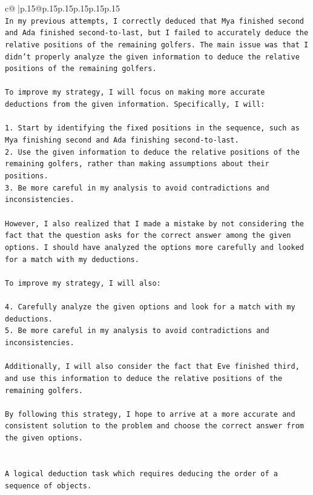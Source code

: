 \documentclass{article}
\begin{document}
{\begin{supertabular}{c@{$\;$}|p{.15\linewidth}@{}p{.15\linewidth}p{.15\linewidth}p{.15\linewidth}p{.15\linewidth}p{.15\linewidth}}
{{{\\ 
\texttt{In my previous attempts, I correctly deduced that Mya finished second and Ada finished second{-}to{-}last, but I failed to accurately deduce the relative positions of the remaining golfers. The main issue was that I didn't properly analyze the given information to deduce the relative positions of the remaining golfers.} \\
\\ 
\texttt{To improve my strategy, I will focus on making more accurate deductions from the given information. Specifically, I will:} \\
\\ 
\texttt{1. Start by identifying the fixed positions in the sequence, such as Mya finishing second and Ada finishing second{-}to{-}last.} \\
\texttt{2. Use the given information to deduce the relative positions of the remaining golfers, rather than making assumptions about their positions.} \\
\texttt{3. Be more careful in my analysis to avoid contradictions and inconsistencies.} \\
\\ 
\texttt{However, I also realized that I made a mistake by not considering the fact that the question asks for the correct answer among the given options. I should have analyzed the options more carefully and looked for a match with my deductions.} \\
\\ 
\texttt{To improve my strategy, I will also:} \\
\\ 
\texttt{4. Carefully analyze the given options and look for a match with my deductions.} \\
\texttt{5. Be more careful in my analysis to avoid contradictions and inconsistencies.} \\
\\ 
\texttt{Additionally, I will also consider the fact that Eve finished third, and use this information to deduce the relative positions of the remaining golfers.} \\
\\ 
\texttt{By following this strategy, I hope to arrive at a more accurate and consistent solution to the problem and choose the correct answer from the given options.} \\
\\ 
\\ 
\texttt{A logical deduction task which requires deducing the order of a sequence of objects.} \\
}}}
\end{supertabular}}
\end{document}
